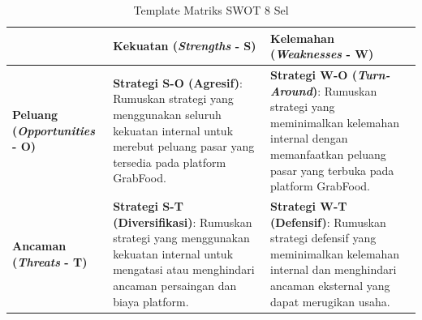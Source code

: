 \begin{table}[H]
    \centering
    \footnotesize
    \caption{Template Matriks SWOT 8 Sel}
    \label{tab:template-matriks-swot-bab3}
    \begin{tabularx}{\textwidth}{|Z{2.8cm}|Y|Y|}
        \hline
         & \textbf{Kekuatan (\textit{Strengths} - S)} & \textbf{Kelemahan (\textit{Weaknesses} - W)} \\ \hline
        \textbf{Peluang (\textit{Opportunities} - O)} & \textbf{Strategi S-O (Agresif)}: Rumuskan strategi yang menggunakan seluruh kekuatan internal untuk merebut peluang pasar yang tersedia pada platform GrabFood. & \textbf{Strategi W-O (\textit{Turn-Around})}: Rumuskan strategi yang meminimalkan kelemahan internal dengan memanfaatkan peluang pasar yang terbuka pada platform GrabFood. \\ \hline
        \textbf{Ancaman (\textit{Threats} - T)} & \textbf{Strategi S-T (Diversifikasi)}: Rumuskan strategi yang menggunakan kekuatan internal untuk mengatasi atau menghindari ancaman persaingan dan biaya platform. & \textbf{Strategi W-T (Defensif)}: Rumuskan strategi defensif yang meminimalkan kelemahan internal dan menghindari ancaman eksternal yang dapat merugikan usaha. \\ \hline
    \end{tabularx}
\end{table}
